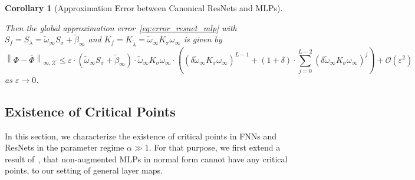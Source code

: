 \documentclass[10pt]{article}
\newtheorem{corollary}[theorem]{Corollary}
\theoremstyle{definition}
\numberwithin{equation}{section}
\newcommand{\eps}{\varepsilon}
\newcommand\norm[1]{\left\lVert#1\right\rVert}
\begin{document}
\begin{corollary}[Approximation Error between Canonical ResNets and MLPs]
\begin{itemize}
	\end{itemize}
	Then the global approximation error~\eqref{eq:error_resnet_mlp} with $S_f = S_\lambda = \widetilde{\omega}_\infty S_\sigma + \tilde{\beta}_\infty$ and  $K_f = K_{\tilde\lambda} =  \widetilde{\omega }_\infty  K_{\sigma} \omega_\infty$ is given by
    \begin{equation*}
		\norm{\Phi-\overline{\Phi}}_{\infty,\mathcal{X}} \leq \eps \cdot  \left(\widetilde{\omega}_\infty S_\sigma + \tilde{\beta}_\infty\right) \cdot \widetilde{\omega }_\infty  K_{\sigma} \omega_\infty \cdot\left( (\delta \widetilde{\omega }_\infty  K_{\sigma} \omega_\infty)^{L-1}  +  (1+\delta) \cdot \sum_{j = 0}^{L-2} (\delta \widetilde{\omega }_\infty  K_{\sigma} \omega_\infty)^j\right)+\mathcal{O}(\eps^2)
	\end{equation*}
    as $\eps \rightarrow 0$.
\end{corollary}

\subsection{Existence of Critical Points}
\label{sec:mlp_criticalpoints}

In this section, we characterize the existence of critical points in FNNs and ResNets in the parameter regime $\alpha \gg 1$. For that purpose, we first extend a result of~\cite{kk2025}, that non-augmented MLPs in normal form cannot have any critical points, to our setting of general layer maps.
\end{document}
